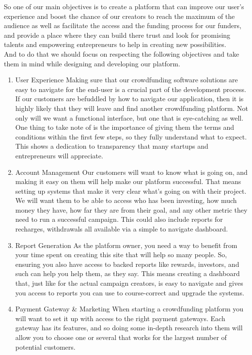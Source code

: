So one of our main objectives is to create a platform that can improve our user's experience and boost the chance of our creators to reach the maximum of the audience as well as facilitate the access and the funding process for our funders, and provide a place where they can build there trust and look for promising talents and empowering entrepreneurs to help in creating new possibilities.\\
And to do that we should focus on respecting the following objectives and take them in mind while designing and developing our platform.
\begin{enumerate}
      \item
            User Experience
            Making sure that our crowdfunding software solutions are easy to navigate for the end-user is a crucial part of the development process. If our customers are befuddled by how to navigate our application, then it is highly likely that they will leave and find another crowdfunding platform. Not only will we want a functional interface, but one that is eye-catching as well.
            One thing to take note of is the importance of giving them the terms and conditions within the first few steps, so they fully understand what to expect. This shows a dedication to transparency that many startups and entrepreneurs will appreciate.

      \item
            Account Management
            Our customers will want to know what is going on, and making it easy on them will help make our platform successful. That means setting up systems that make it very clear what’s going on with their project. We will want them to be able to access who has been investing, how much money they have, how far they are from their goal, and any other metric they need to run a successful campaign. This could also include reports for recharges, withdrawals all available via a simple to navigate dashboard.
      \item

            Report Generation
            As the platform owner, you need a way to benefit from your time spent on creating this site that will help so many people. So, ensuring you also have access to backed reports like rewards, investors, and such can help you help them, as they say. This means creating a dashboard that, just like for the actual campaign creators, is easy to navigate and gives you access to reports you can use to course-correct and upgrade the systems.
      \item
            Payment Gateway \& Marketing
            When starting a crowdfunding platform you will want to set it up with access to the right payment gateways. Each gateway has its features, and so doing some in-depth research into them will allow you to choose one or several that works for the largest number of potential customers.
\end{enumerate}


